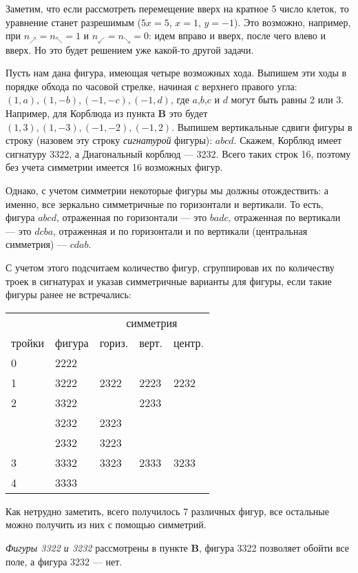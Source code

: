 \begin{itemize}
Заметим, что если рассмотреть перемещение вверх на кратное 5 число клеток, то 
уравнение станет разрешимым ($5x = 5$, $x=1$, $y=-1$). Это возможно, например,
при $n_\nearrow = n_\nwarrow = 1$ и $n_\swarrow = n_\searrow = 0$: идем вправо и вверх,
после чего влево и вверх. Но это будет решением уже какой-то другой задачи.

\itC Пусть нам дана фигура, имеющая четыре возможных хода. Выпишем эти ходы
в порядке обхода по часовой стрелке, начиная с верхнего правого угла:
$(1,a),(1,-b),(-1,-c),(-1,d)$, где $a$,$b$,$c$ и $d$ могут быть равны 2 или 3. 
Например, для Корблюда из пункта {\bfseries B} это будет $(1,3),(1,-3),(-1,-2),(-1,2)$.
Выпишем вертикальные сдвиги фигуры в строку (назовем эту строку \emph{сигнатурой} фигуры):
$abcd$. Скажем, Корблюд имеет сигнатуру 3322, а Диагональный корблюд --- 3232. 
Всего таких строк 16, поэтому без учета симметрии имеется 16 возможных фигур.

Однако, с учетом симметрии некоторые фигуры мы должны отождествить: а именно, все зеркально
симметричные по горизонтали и вертикали. То есть, фигура $abcd$, отраженная по горизонтали --- 
это $badc$, отраженная по вертикали --- это $dcba$, отраженная и по горизонтали и по 
вертикали (центральная симметрия) --- $cdab$.

С учетом этого подсчитаем количество фигур, сгруппировав их по количеству троек в сигнатурах
и указав симметричные варианты для фигуры, если такие фигуры ранее не встречались:

\begin{center}\begin{tabular}{lllll}
       &        & \multicolumn{3}{c}{симметрия}\\\cline{3-5}
тройки & фигура & гориз. & верт. & центр.\\
\hline
0 & 2222                       \\
1 & 3222 & 2322 & 2223 & 2232\\
2 & 3322 &      & 2233 & \\
  & 3232 & 2323 & & \\
  & 2332 & 3223 & & \\
3 & 3332 & 3323 & 2333 & 3233 \\
4 & 3333 & 
\end{tabular}\end{center}

Как нетрудно заметить, всего получилось 7 различных фигур, все остальные можно получить из них с помощью симметрий.

\emph{Фигуры 3322 и 3232} рассмотрены в пункте {\bfseries B}, фигура 3322 позволяет обойти все поле, а 
фигура 3232 --- нет. 


\end{itemize}
